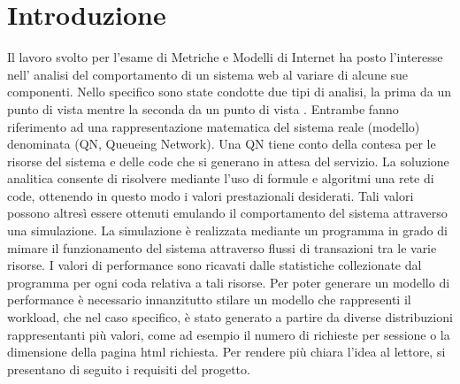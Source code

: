 \chapter{Introduzione}
Il lavoro svolto per l'esame di Metriche e Modelli di Internet ha posto l'interesse nell' analisi del comportamento di un sistema web al variare di alcune sue componenti. Nello specifico sono state condotte due tipi di analisi, la prima da un punto di vista  mentre la seconda da un punto di vista . Entrambe fanno riferimento ad una rappresentazione matematica del sistema reale (modello) denominata  (QN, Queueing Network). Una QN tiene conto della contesa per le risorse del sistema e delle code che si generano in attesa del servizio. 
La soluzione analitica consente di risolvere mediante l’uso di formule e algoritmi una rete di code, ottenendo in questo modo i valori prestazionali desiderati. Tali valori possono altresì essere ottenuti emulando il comportamento del sistema attraverso una simulazione. 
La simulazione è realizzata mediante un programma in grado di mimare il funzionamento del sistema attraverso flussi di transazioni tra le varie risorse. I valori di performance sono ricavati dalle statistiche collezionate dal programma per ogni coda relativa a tali risorse. 
Per poter generare un modello di performance è necessario innanzitutto stilare un modello che rappresenti il workload, che nel caso specifico, è stato generato a partire da diverse distribuzioni rappresentanti più valori, come ad esempio il numero di richieste per sessione o la dimensione della pagina html richiesta. 
Per rendere più chiara l'idea al lettore, si presentano di seguito i requisiti del progetto.

